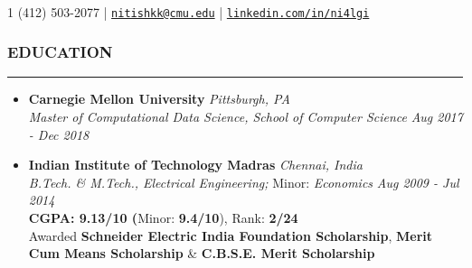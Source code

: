 \documentclass[10pt,a4paper,English]{article}
\newcommand\roottitle[1]{\vspace{-4mm}\subsubsection*{\uppercase{#1}}\vspace{-0.3em}\nopagebreak[4]\hrule\vspace{4mm}}
\newcommand\itemyear[1]{\hfill \emph{\color{itemyear} #1}}
\newcommand\itemenvnoindent{\setlength\itemsep{-1pt} \vspace{-1.5mm}}
\newcommand\hspacing{1mm}
\begin{document}
 \\
\vspace{-5mm}

\small

\begin{center}
    \textsmaller{+}1 (412) 503-2077 | \href{mailto:nitishkk@cmu.edu}{\texttt{nitishkk\mbox{}@\mbox{}cmu.edu}} | \href{https://www.linkedin.com/in/ni4lgi}{\texttt{linkedin.com/in/ni4lgi}} \\
\end{center}



\roottitle{Education}
    \begin{itemize}[leftmargin=11pt] \itemenvnoindent
    
    \item \textbf{Carnegie Mellon University} \itemyear{Pittsburgh, PA}\\[\hspacing]
        \textit{Master of Computational Data Science, School of Computer Science} \itemyear{Aug 2017 - Dec 2018} \\[\hspacing]

    \vspace{-3mm}

    \item \textbf{Indian Institute of Technology Madras}  \itemyear{Chennai, India}\\[\hspacing]
        \textit{B.Tech. \& M.Tech., Electrical Engineering;} Minor: \textit{Economics} \itemyear{Aug 2009 - Jul 2014}\\[\hspacing]
        \textbf{CGPA: 9.13/10 (}Minor: \textbf{9.4/10}), Rank: \textbf{2/24} \\[\hspacing]
        Awarded \textbf{Schneider Electric India Foundation Scholarship},
        \textbf{Merit Cum Means Scholarship} \& \textbf{C.B.S.E. Merit Scholarship}
    \end{itemize}
\end{document}
